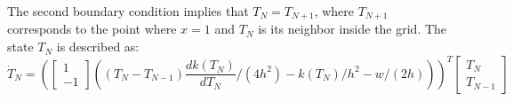 

{\color{blue}The second boundary condition implies that $T_{N} = T_{N+1}$, where $T_{N+1}$ corresponds to the point where $x = 1$ and $T_{N}$ is its neighbor inside the grid.}
%
The state $T_N$ is described as:
\begin{equation} \label{eqn:fdm_boundary2}
  \dot{T}_N =
  \left(\begin{bmatrix}
     1\\
     -1
  \end{bmatrix}\left((T_N - T_{N-1})\frac{d k(T_N) }{d T_N}
     / (4h^2) - k(T_N)/h^2-w/(2h)\right)
     \right)^T
  \begin{bmatrix}
      T_N\\
      T_{N-1}
  \end{bmatrix}
\end{equation}




